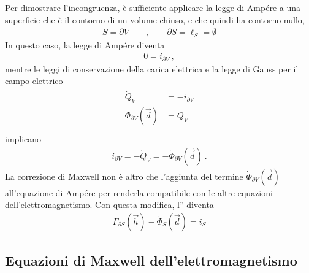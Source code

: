 \documentclass[letterpaper,10pt,italian]{jupyterBook}
\begin{document}
\sphinxAtStartPar
Per dimostrare l’incongruenza, è sufficiente applicare la legge di Ampére a una superficie che è il contorno di un volume chiuso, e che quindi ha contorno nullo,
\begin{equation*}
\begin{split}S = \partial V  \qquad , \qquad  \partial S = \ell_S = \emptyset\end{split}
\end{equation*}
\sphinxAtStartPar
In questo caso, la legge di Ampére diventa
\begin{equation*}
\begin{split}0 = i_{\partial V} \ ,\end{split}
\end{equation*}
\sphinxAtStartPar
mentre le leggi di conservazione della carica elettrica e la legge di Gauss per il campo elettrico
\begin{equation*}
\begin{split}\begin{aligned}
  \dot{Q}_V & = - i_{\partial V} \\
  \Phi_{\partial V}(\vec{d}) & = Q_V \\
\end{aligned}\end{split}
\end{equation*}
\sphinxAtStartPar
implicano
\begin{equation*}
\begin{split}i_{\partial V} = - \dot{Q}_V = - \dot{\Phi}_{\partial V}(\vec{d}) \ .\end{split}
\end{equation*}
\sphinxAtStartPar
La correzione di Maxwell non è altro che l’aggiunta del termine \(\dot{\Phi}_{\partial V}(\vec{d})\) all’equazione di Ampére per renderla compatibile con le altre equazioni dell’elettromagnetismo. Con questa modifica, l” diventa
\begin{equation*}
\begin{split}\Gamma_{\partial S}(\vec{h}) - \dot{\Phi}_{S}(\vec{d}) = i_S \end{split}
\end{equation*}
\sphinxAtStartPar
{} 


\subsection{Equazioni di Maxwell dell’elettromagnetismo}
\label{\detokenize{ch/electromagnetism/electromagnetism-general:equazioni-di-maxwell-dell-elettromagnetismo}}\label{\detokenize{ch/electromagnetism/electromagnetism-general:physics-hs-electromagnetism-electromagnetism-general-maxwell}}
\end{document}
